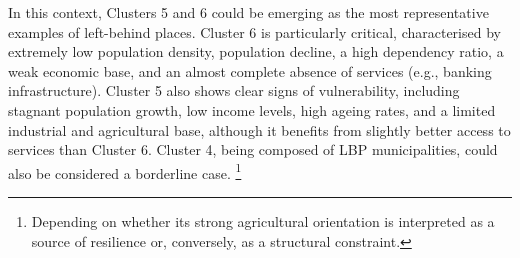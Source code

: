 \documentclass[a4paper,11pt,oneside]{article}
\begin{document}
In this context, Clusters 5 and 6 could be emerging as the most representative examples of left-behind places. Cluster 6 is particularly critical, characterised by extremely low population density, population decline, a high dependency ratio, a weak economic base, and an almost complete absence of services (e.g., banking infrastructure). Cluster 5 also shows clear signs of vulnerability, including stagnant population growth, low income levels, high ageing rates, and a limited industrial and agricultural base, although it benefits from slightly better access to services than Cluster 6. Cluster 4, being composed of LBP municipalities, could also be considered a borderline case. \footnote{Depending on whether its strong agricultural orientation is interpreted as a source of resilience \citep{martin} or, conversely, as a structural constraint.}
\end{document}
